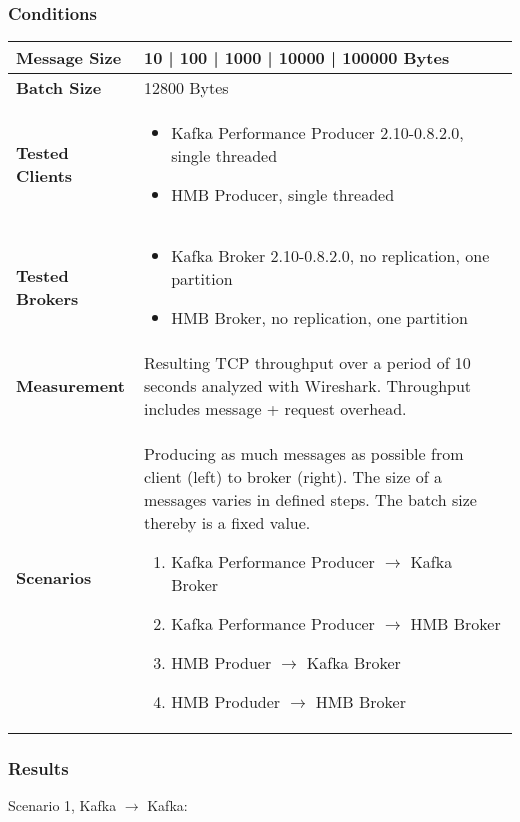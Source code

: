 \subsubsection{Conditions}
\begin{table}[H]
\begin{tabular}{|l| p{12cm}|} \hline
{\bf Message Size}   & 10 | 100 | 1000 | 10000 | 100000 Bytes \\ \hline
{\bf Batch Size}     & 12800 Bytes \\ \hline
{\bf Tested Clients} &
    \begin{itemize}
        \item Kafka Performance Producer 2.10-0.8.2.0, single threaded
        \item HMB Producer, single threaded
    \end{itemize}\\ \hline
{\bf Tested Brokers} &
    \begin{itemize}
        \item Kafka Broker 2.10-0.8.2.0, no replication, one partition
        \item HMB Broker, no replication, one partition
    \end{itemize}\\ \hline
{\bf Measurement} & Resulting TCP throughput over a period of 10 seconds analyzed with
    Wireshark. Throughput includes message + request overhead.\\ \hline
{\bf Scenarios} & Producing as much messages as possible from client (left) to broker (right).
    The size of a messages varies in defined steps. The batch size thereby is a fixed value. 
  \begin{enumerate}
        \item Kafka Performance Producer $\rightarrow$ Kafka Broker
        \item Kafka Performance Producer $\rightarrow$ HMB Broker
        \item HMB Produer $\rightarrow$ Kafka Broker
        \item HMB Produder $\rightarrow$ HMB Broker
    \end{enumerate} \\ \hline
\end{tabular}
\end{table}

\newpage
\subsubsection{Results}
Scenario 1, Kafka $\rightarrow$ Kafka:

